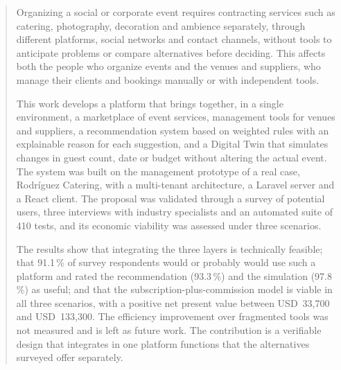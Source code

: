 
\begin{abstract}

Organizing a social or corporate event requires contracting services such
as catering, photography, decoration and ambience separately, through
different platforms, social networks and contact channels, without tools
to anticipate problems or compare alternatives before deciding. This
affects both the people who organize events and the venues and suppliers,
who manage their clients and bookings manually or with independent tools.

This work develops a platform that brings together, in a single
environment, a marketplace of event services, management tools for venues
and suppliers, a recommendation system based on weighted rules with an
explainable reason for each suggestion, and a Digital Twin that simulates
changes in guest count, date or budget without altering the actual event.
The system was built on the management prototype of a real case,
Rodríguez Catering, with a multi-tenant architecture, a Laravel server and
a React client. The proposal was validated through a survey of potential
users, three interviews with industry specialists and an automated suite of
410 tests, and its economic viability was assessed under three scenarios.

The results show that integrating the three layers is technically
feasible; that 91.1\,\% of survey respondents would or probably would use
such a platform and rated the recommendation (93.3\,\%) and the simulation
(97.8\,\%) as useful; and that the subscription-plus-commission model is
viable in all three scenarios, with a positive net present value between
USD~33,700 and USD~133,300. The efficiency improvement over fragmented
tools was not measured and is left as future work. The contribution is a
verifiable design that integrates in one platform functions that the
alternatives surveyed offer separately.

\end{abstract}
